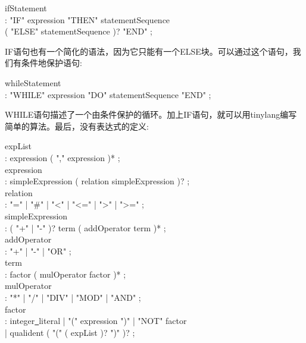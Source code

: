 \begin{tcolorbox}[colback=white,colframe=black]
ifStatement \\
\hspace*{0.5cm}: "IF" expression "THEN" statementSequence \\
\hspace*{0.5cm}( "ELSE" statementSequence )? "END" ;
\end{tcolorbox}

IF语句也有一个简化的语法，因为它只能有一个ELSE块。可以通过这个语句，我们有条件地保护语句:\par

\begin{tcolorbox}[colback=white,colframe=black]
whileStatement \\
\hspace*{0.5cm}: "WHILE" expression "DO" statementSequence "END" ;
\end{tcolorbox}

WHILE语句描述了一个由条件保护的循环。加上IF语句，就可以用tinylang编写简单的算法。最后，没有表达式的定义:\par

\begin{tcolorbox}[colback=white,colframe=black]
expList \\
\hspace*{0.5cm}: expression ( "," expression )* ; \\
expression \\
\hspace*{0.5cm}: simpleExpression ( relation simpleExpression )? ; \\
relation \\
\hspace*{0.5cm}: "=" | "\#" | "<" | "<=" | ">" | ">=" ; \\
simpleExpression \\
\hspace*{0.5cm}: ( "+" | "-" )? term ( addOperator term )* ; \\
addOperator \\
\hspace*{0.5cm}: "+" | "-" | "OR" ; \\
term \\
\hspace*{0.5cm}: factor ( mulOperator factor )* ; \\
mulOperator \\
\hspace*{0.5cm}: "*" | "/" | "DIV" | "MOD" | "AND" ; \\
factor \\
\hspace*{0.5cm}: integer\underline{~}literal | "(" expression ")" | "NOT" factor \\
| qualident ( "(" ( expList )? ")" )? ;
\end{tcolorbox}

